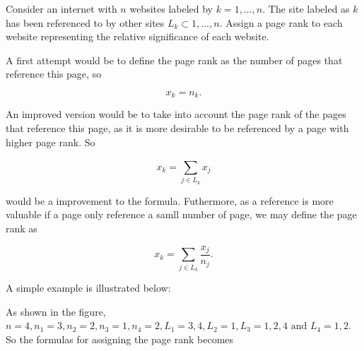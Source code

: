 \documentclass[a4paper,12pt]{report}
\begin{document}
{Consider an internet with \(n\) websites labeled by \(k = 1, \ldots , n\). The site labeled as \(k\) has been referenced to by other sites \(L_{k} \subset {1, \ldots , n}\). Assign a page rank to each website representing the relative significance of each website.}
{A first attempt would be to define the page rank as the number of pages that reference this page, so 

\begin{equation}
    x_{k} = n_{k}.
\end{equation}

An improved version would be to take into account the page rank of the pages that reference this page, as it is more desirable to be referenced by a page with higher page rank. So 

\begin{equation}
    x_{k} = \sum_{j \in L_{k} }^{} x_{j}   
\end{equation}

would be a improvement to the formula. Futhermore, as a reference is more valuable if a page only reference a samll number of page, we may define the page rank as 

\begin{equation}
    x_{k} = \sum_{j \in L_{k} }^{} \frac{x_{j} }{n_{j} }.   
\end{equation}

A simple example is illustrated below:

\begin{center}
\end{center}

As shown in the figure, \(n=4, n_{1}=3, n_{2} = 2, n_3 = 1, n_4 = 2, L_{1} = {3,4}, L_{2} = {1}, L_3 = {1,2,4} \text { and } L_4 = {1,2}\). So the formulas for assigning the page rank becomes

}
\end{document}
